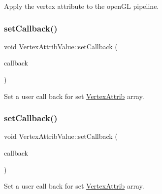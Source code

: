 Apply the vertex attribute to the open\+GL pipeline. \mbox{\label{classVertexAttribValue_a400a133fa7dd41f7cb6037a25c3853a8}} 
\subsubsection{\texorpdfstring{set\+Callback()}{setCallback()}\hspace{0.1cm}{\footnotesize\ttfamily [1/2]}}
{\footnotesize\ttfamily void Vertex\+Attrib\+Value\+::set\+Callback (\begin{DoxyParamCaption}\item[{const std\+::function$<$ void(\hyperlink{structVertexAttrib}{Vertex\+Attrib} $\ast$)$>$ \&}]{callback }\end{DoxyParamCaption})}

Set a user call back for set \hyperlink{structVertexAttrib}{Vertex\+Attrib} array. \mbox{\label{classVertexAttribValue_a400a133fa7dd41f7cb6037a25c3853a8}} 
\subsubsection{\texorpdfstring{set\+Callback()}{setCallback()}\hspace{0.1cm}{\footnotesize\ttfamily [2/2]}}
{\footnotesize\ttfamily void Vertex\+Attrib\+Value\+::set\+Callback (\begin{DoxyParamCaption}\item[{const std\+::function$<$ void(\hyperlink{structVertexAttrib}{Vertex\+Attrib} $\ast$)$>$ \&}]{callback }\end{DoxyParamCaption})}

Set a user call back for set \hyperlink{structVertexAttrib}{Vertex\+Attrib} array. \mbox{\label{classVertexAttribValue_aa60f95167e0f4f532db83aa9538e143c}} 
